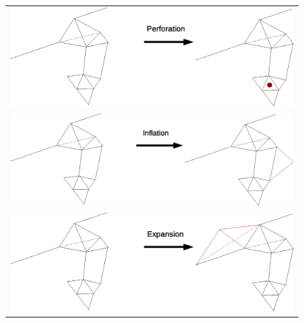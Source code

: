 \documentclass[12pt,letterpaper]{report}
\begin{document}
\begin{figure}[htp]
\centering
\label{implicative2}
\begin{tabular}{c}
\includegraphics[width=5in]{images/perforation.eps} \\
\includegraphics[width=5in]{images/inflation.eps} \\
\includegraphics[width=5in]{images/expansion.eps}
\end{tabular}
\end{figure}
\end{document}

